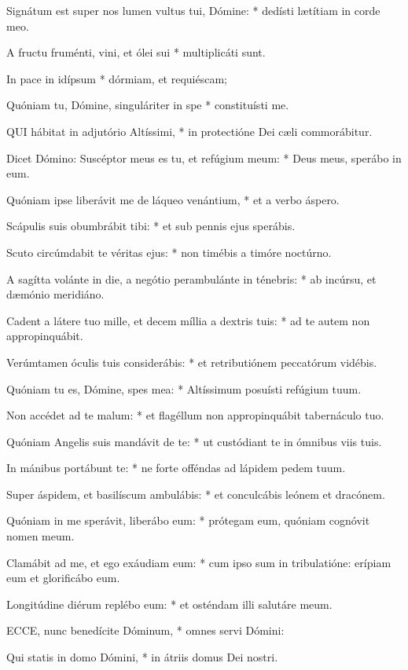 Signátum est super nos lumen vultus tui, Dómine: * dedísti lætítiam in corde meo.

A fructu fruménti, vini, et ólei sui * multiplicáti sunt.

In pace in idípsum * dórmiam, et requiéscam;

Quóniam tu, Dómine, singuláriter in spe * constituísti me.


\lettrine[lines=2]{Q}{UI} hábitat in adjutório Altíssimi, * in protectióne Dei cæli commorábitur.

Dicet Dómino: Suscéptor meus es tu, et refúgium meum: * Deus meus, sperábo in eum.

Quóniam ipse liberávit me de láqueo venántium, * et a verbo áspero.

Scápulis suis obumbrábit tibi: * et sub pennis ejus sperábis.

Scuto circúmdabit te véritas ejus: * non timébis a timóre noctúrno.

A sagítta volánte in die, a negótio perambulánte in ténebris: * ab incúrsu, et dæmónio meridiáno.

Cadent a látere tuo mille, et decem míllia a dextris tuis: * ad te autem non appropinquábit.

Verúmtamen óculis tuis considerábis: * et retributiónem peccatórum vidébis.

Quóniam tu es, Dómine, spes mea: * Altíssimum posuísti refúgium tuum.

Non accédet ad te malum: * et flagéllum non appropinquábit tabernáculo tuo.

Quóniam Angelis suis mandávit de te: * ut custódiant te in ómnibus viis tuis.

In mánibus portábunt te: * ne forte offéndas ad lápidem pedem tuum.

Super áspidem, et basilíscum ambulábis: * et conculcábis leónem et dracónem.

Quóniam in me sperávit, liberábo eum: * prótegam eum, quóniam cognóvit nomen meum.

Clamábit ad me, et ego exáudiam eum: * cum ipso sum in tribulatióne: erípiam eum et glorificábo eum.

Longitúdine diérum replébo eum: * et osténdam illi salutáre meum.


\lettrine[lines=2]{E}{CCE}, nunc benedícite Dóminum, * omnes servi Dómini:

Qui statis in domo Dómini, * in átriis domus Dei nostri.

